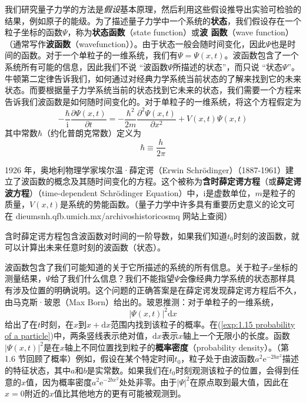 	我们研究量子力学的方法是\textit{假设}基本原理，然后利用这些假设推导出实验可检验的结果，例如原子的能级。为了描述量子力学中一个系统的\textbf{状态}，我们假设存在一个粒子坐标的函数$\Psi$，称为\textbf{状态函数}（state function）或\textbf{波 函数}（wave function）（通常写作\textbf{波函数}（wavefunction））。由于状态一般会随时间变化，因此$\Psi$也是时间的函数。对于一个单粒子的一维系统，我们有$\Psi=\Psi\left(x,t\right)$。波函数包含了一个系统所有可能的信息，因此我们不说 “波函数$\Psi$所描述的状态”，而只说 “状态$\Psi$”。 牛顿第二定律告诉我们，如何通过对经典力学系统当前状态的了解来找到它的未来状态。而要根据量子力学系统当前的状态找到它未来的状态，我们需要一个方程来告诉我们波函数是如何随时间变化的。对于单粒子的一维系统，将这个方程假定为
	\begin{equation}
		-\frac{\hbar}{\mathrm{i}}\frac{\partial \Psi \left(x,t\right)}{\partial t}= -\frac{\hbar^2}{2m}\frac{\partial^2 \Psi \left(x,t\right)}{\partial x^2}+ V\left(x,t\right)\Psi\left(x,t\right)
		\label{eq:1.13 Time-dependent Schödinger equation}
	\end{equation}
	其中常数$\hbar$（约化普朗克常数）定义为
	\begin{equation}
		\boxed{\hbar \equiv \frac{h}{2 \pi}}
		\label{eq:1.14 h-bar's definition}
	\end{equation}

	1926 年，奥地利物理学家埃尔温·薛定谔（Erwin Schrödinger）（1887-1961）建立了波函数的概念及其随时间变化的方程。这个被称为\textbf{含时薛定谔方程}（或\textbf{薛定谔波方程}）（time-dependent Schrödinger Equation）中，$\mathrm{i}$是虚数单位，$m$是粒子的质量，$V\left(x,t\right)$是系统的势能函数。（量子力学中许多具有重要历史意义的论文可在 dieumsnh.qfb.umich.mx/archivoshistoricosmq 网站上查阅）

	含时薛定谔方程包含波函数对时间的一阶导数，如果我们知道$t_0$时刻的波函数，就可以计算出未来任意时刻的波函数（状态）。

	波函数包含了我们可能知道的关于它所描述的系统的所有信息。关于粒子$x$坐标的测量结果，$\Psi$给了我们什么信息？我们不能指望$\Psi$会像经典力学系统的状态那样具有涉及位置的明确说明。这个问题的正确答案是在薛定谔发现薛定谔方程后不久，由马克斯·玻恩（Max Born）给出的。玻恩推测：对于单粒子的一维系统，
	\begin{equation}
		\left|\Psi \left(x,t\right)\right|^2 \mathrm{d}x
		\label{exp:1.15 probability of a particle}
	\end{equation}
	给出了在$t$时刻，在$x$到$x+ \mathrm{d}x$范围内找到该粒子的概率。在(\ref{exp:1.15 probability of a particle})中，两条竖线表示绝对值，$\mathrm{d}x$表示$x$轴上一个无限小的长度。函数$\left|\Psi \left(x,t\right)\right|^2$是在$x$轴上不同位置找到粒子的\textbf{概率密度}（probability density）。（第 1.6 节回顾了概率）例如，假设在某个特定时间$t_0$，粒子处于由波函数$a^2\mathrm{e}^{-2bx^2}$描述的特征状态，其中$a$和$b$是实常数。如果我们在$t_0$时刻观测该粒子的位置，会得到任意的$x$值，因为概率密度$a^2\mathrm{e}^{-2bx^2}$处处非零。由于$\left|\Psi\right|^2$在原点取到最大值，因此在$x=0$附近的$x$值比其他地方的更有可能被观测到。


